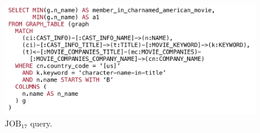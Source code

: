 
\begin{figure}[ht]
    \centering
    \includegraphics[width=\linewidth]{./figures/job17a-query.pdf}
    \caption{$\text{JOB}_{17}$ query.}
    \label{fig:job17-query}
\end{figure}


